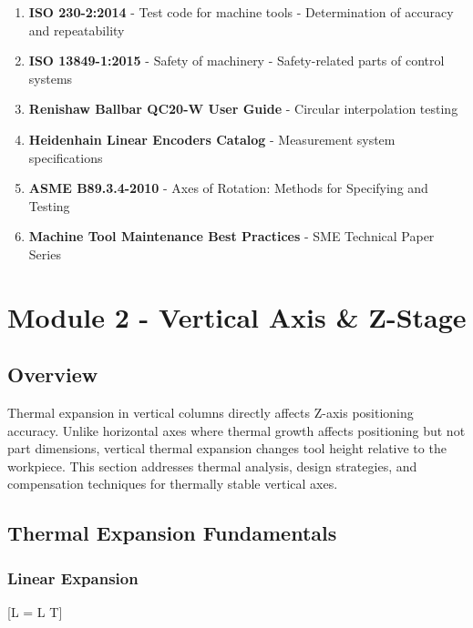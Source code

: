 \documentclass[
]{article}
\providecommand{\tightlist}{%
  \setlength{\itemsep}{0pt}\setlength{\parskip}{0pt}}
\begin{document}
\begin{enumerate}
\def\labelenumi{\arabic{enumi}.}
\tightlist
\item
  \textbf{ISO 230-2:2014} - Test code for machine tools - Determination
  of accuracy and repeatability
\item
  \textbf{ISO 13849-1:2015} - Safety of machinery - Safety-related parts
  of control systems
\item
  \textbf{Renishaw Ballbar QC20-W User Guide} - Circular interpolation
  testing
\item
  \textbf{Heidenhain Linear Encoders Catalog} - Measurement system
  specifications
\item
  \textbf{ASME B89.3.4-2010} - Axes of Rotation: Methods for Specifying
  and Testing
\item
  \textbf{Machine Tool Maintenance Best Practices} - SME Technical Paper
  Series
\end{enumerate}

\newpage

\section{Module 2 - Vertical Axis \&
Z-Stage}\label{module-2---vertical-axis-z-stage-4}

\subsection{Overview}\label{overview-3}

Thermal expansion in vertical columns directly affects Z-axis
positioning accuracy. Unlike horizontal axes where thermal growth
affects positioning but not part dimensions, vertical thermal expansion
changes tool height relative to the workpiece. This section addresses
thermal analysis, design strategies, and compensation techniques for
thermally stable vertical axes.

\subsection{Thermal Expansion
Fundamentals}\label{thermal-expansion-fundamentals}

\subsubsection{Linear Expansion}\label{linear-expansion}

{[}\Delta L = \alpha \times L \times \Delta T{]}
\end{document}
